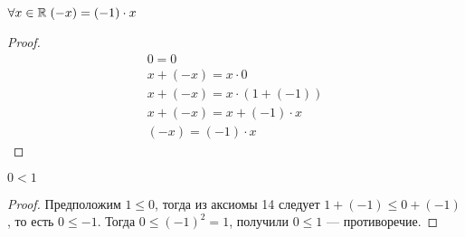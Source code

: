     \begin{theorem}
        $\forall x \in \mathbb{R} \; (-x) = (-1) \cdot x$
    \end{theorem} \begin{proof}
        \begin{gather*}
            0 = 0 \\
        x + (-x) = x \cdot 0 \\
        x + (-x) = x \cdot (1 + (-1)) \\
        x + (-x) = x + (-1) \cdot x \\
        (-x) = (-1) \cdot x
        \end{gather*}
    \end{proof}
    \begin{theorem}
        $ 0 < 1 $
    \end{theorem} \begin{proof}
        Предположим $ 1 \leq 0 $, тогда из аксиомы 14 следует $ 1 + (-1) \leq 0 + (-1) $, то есть $ 0 \leq - 1 $.
        Тогда $ 0 \leq ( - 1)^2 = 1 $, получили $ 0 \leq  1 $ --- противоречие.
    \end{proof}
